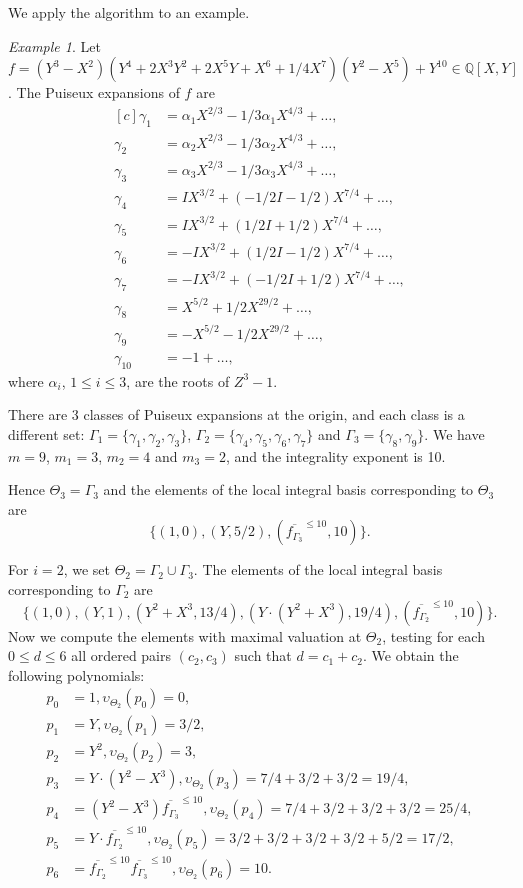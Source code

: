 \documentclass[a4paper,11pt]{amsart}%
\theoremstyle{definition}
\theoremstyle{plain}
\theoremstyle{remark}
\newtheorem{example}[defn]{Example}
\begin{document}
We apply the algorithm to an example.

\begin{example}
Let $f = (Y^3-X^2)(Y^4 + 2X^3Y^2 + 2X^5Y + X^6 + 1/4X^7)(Y^2-X^5) + Y^{10} \in{\mathbb{Q}}[X,Y]$.
The Puiseux expansions of $f$ are
$$
\begin{aligned}[c]
\gamma_{1} &=\alpha_1 X^{2/3} - 1/3 \alpha_1 X^{4/3} + \dots,\\
\gamma_{2} &=\alpha_2 X^{2/3} - 1/3 \alpha_2 X^{4/3} + \dots,\\
\gamma_{3} &=\alpha_3 X^{2/3} - 1/3 \alpha_3 X^{4/3} + \dots,\\
\gamma_{4} &=IX^{3/2} +(-1/2I-1/2)X^{7/4} + \dots,\\
\gamma_{5} &=IX^{3/2} +(1/2I+1/2)X^{7/4} + \dots,\\
\gamma_{6} &=-IX^{3/2}+(1/2I-1/2)X^{7/4} + \dots,\\
\gamma_{7} &=-IX^{3/2}+(-1/2I+1/2)X^{7/4} + \dots,\\
\gamma_{8} &=X^{5/2}+ 1/2  X^{29/2} + \dots,\\
\gamma_{9} &=-X^{5/2} - 1/2  X^{29/2} +  \dots,\\
\gamma_{10} &=-1 + \dots,
\end{aligned}
$$
where $\alpha_{i}$, $1 \le i \le 3$, are the roots of $Z^{3}-1$.

There are 3 classes of Puiseux expansions at the origin, and each class is a different set: $\Gamma_1 = \{\gamma_1, \gamma_2, \gamma_3\}$, $\Gamma_2 = \{\gamma_4, \gamma_5, \gamma_6, \gamma_7\}$ and $\Gamma_3 = \{\gamma_8, \gamma_9\}$. We have $m=9$, $m_{1} = 3$, $m_2 = 4$  and $m_{3} = 2$, and the integrality exponent is 10.

Hence $\Theta_{3} = \Gamma_{3}$ and
the elements of the local integral basis corresponding to $\Theta_{3}$ are
$$\{(1, 0), (Y, 5/2), (\overline{f_{\Gamma_3}}^{\le 10}, 10)\}.$$

For $i = 2$, we set $\Theta_{2} = \Gamma_2 \cup \Gamma_3$. The
elements of the local integral basis corresponding to $\Gamma_{2}$ are
$$\{(1, 0), (Y,
1), (Y^2+X^3, 13/4), (Y\cdot(Y^2 + X^3), 19/4), (\overline{f_{\Gamma_2}}^{\le 10}, 10)\}.$$
Now we compute the elements with maximal valuation at $\Theta_2$, testing for each $0 \le d \le 6$ all ordered pairs $(c_2, c_3)$ such that $d = c_1 + c_2$. We obtain the following polynomials:
$$
\begin{aligned}
p_0 &= 1, \upsilon_{\Theta_2}(p_0) = 0, \\
p_1 &= Y, \upsilon_{\Theta_2}(p_1) = 3/2, \\
p_2 &= Y^2, \upsilon_{\Theta_2}(p_2) = 3, \\
p_3 &= Y\cdot(Y^2-X^3), \upsilon_{\Theta_2}(p_3) = 7/4+3/2+3/2 = 19/4, \\
p_4 &= (Y^2-X^3)\overline{f_{\Gamma_3}}^{\le 10}, \upsilon_{\Theta_2}(p_4) = 7/4+3/2+3/2+3/2 = 25/4,\\
p_5 &= Y\cdot\overline{f_{\Gamma_2}}^{\le 10}, \upsilon_{\Theta_2}(p_5) = 3/2+3/2+3/2+3/2+5/2 = 17/2, \\
p_6 &= \overline{f_{\Gamma_2}}^{\le 10}\overline{f_{\Gamma_3}}^{\le 10}, \upsilon_{\Theta_2}(p_6) = 10.
\end{aligned}
$$


\end{example}
\end{document}
